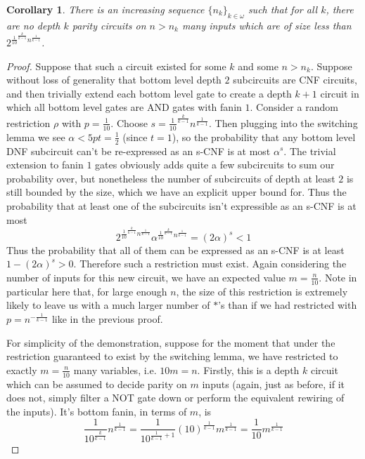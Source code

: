\documentclass{article}
\theoremstyle{definition}
\theoremstyle{plain}
\theoremstyle{theorem}
\newtheorem{corollary}{Corollary}[section]
\begin{document}
\begin{corollary}
	There is an increasing sequence $\{n_k\}_{k \in \omega}$ such that for all $k$, there are no depth $k$ parity circuits on $n > n_k$ many inputs which are of size less than $2^{\frac{1}{10}^{\frac{k}{k-1}}n^{\frac{1}{k-1}}}$.
\end{corollary}
\begin{proof}
	Suppose that such a circuit existed for some $k$ and some $n > n_k$. Suppose without loss of generality that bottom level depth $2$ subcircuits are CNF circuits, and then trivially extend each bottom level gate to create a depth $k+1$ circuit in which all bottom level gates are AND gates with fanin $1$. Consider a random restriction $\rho$ with $p = \frac{1}{10}$. Choose $s = \frac{1}{10}^{\frac{k}{k-1}}n^{\frac{1}{k-1}}$. Then plugging into the switching lemma we see $\alpha < 5pt = \frac{1}{2}$ (since $t = 1$), so the probability that any bottom level DNF subcircuit can't be re-expressed as an s-CNF is at most $\alpha^s$. The trivial extension to fanin $1$ gates obviously adds quite a few subcircuits to sum our probability over, but nonetheless the number of subcircuits of depth at least $2$ is still bounded by the size, which we have an explicit upper bound for. Thus the probability that at least one of the subcircuits isn't expressible as an s-CNF is at most 
	\[ 2^{\frac{1}{10}^{\frac{k}{k-1}}n^{\frac{1}{k-1}}}\alpha^{\frac{1}{10}^{\frac{k}{k-1}}n^{\frac{1}{k-1}}} = (2\alpha)^s < 1 \]
Thus the probability that all of them can be expressed as an s-CNF is at least $1-(2\alpha)^s > 0$. Therefore such a restriction must exist. Again considering the number of inputs for this new circuit, we have an expected value $m = \frac{n}{10}$. Note in particular here that, for large enough $n$, the size of this restriction is extremely likely to leave us with a much larger number of $*$'s than if we had restricted with $p = n^{-\frac{1}{k-1}}$ like in the previous proof. \par
For simplicity of the demonstration, suppose for the moment that under the restriction guaranteed to exist by the switching lemma, we have restricted to exactly $m = \frac{n}{10}$ many variables, i.e. $10m = n$. Firstly, this is a depth $k$ circuit which can be assumed to decide parity on $m$ inputs (again, just as before, if it does not, simply filter a NOT gate down or perform the equivalent rewiring of the inputs). It's bottom fanin, in terms of $m$, is 
\[ \frac{1}{10^{\frac{k}{k-1}}}n^{\frac{1}{k-1}} = \frac{1}{10^{\frac{1}{k-1}+1}}(10)^{\frac{1}{k-1}}m^{\frac{1}{k-1}} = \frac{1}{10}m^{\frac{1}{k-1}} \]

\end{proof}
\end{document}

